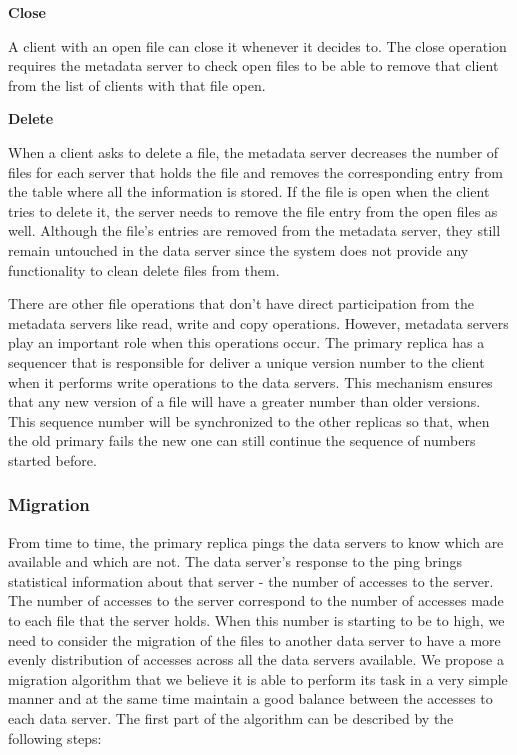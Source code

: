 
\bigskip
\textbf{Close}
\smallskip

A client with an open file can close it whenever it decides to. The close
operation requires the metadata server to check open files to be able to
remove that client from the list of clients with that file open.

\bigskip
\textbf{Delete}
\smallskip

When a client asks to delete a file, the metadata server decreases the
number of files for each server that holds the file and removes the 
corresponding entry from the table where all the information is stored.
If the file is open when the client tries to delete it, the server needs
to remove the file entry from the open files as well.
Although the file's entries are removed from the metadata server, they
still remain untouched in the data server since the system does not provide
any functionality to clean delete files from them.

\bigskip

There are other file operations that don't have direct participation from the
metadata servers like read, write and copy operations. However, metadata servers
play an important role when this operations occur. The primary replica has a sequencer
that is responsible for deliver a unique version number to the client when it performs
write operations to the data servers. This mechanism ensures that any new version of a
file will have a greater number than older versions. This sequence number will be
synchronized to the other replicas so that, when the old primary fails the new one can
still continue the sequence of numbers started before.

\subsubsection{Migration}

From time to time, the primary replica pings the data servers to know
which are available and which are not. The data server's response to the ping
brings statistical information about that server - the number of accesses to
the server. The number of accesses to the server correspond to the number
of accesses made to each file that the server holds. When this number is
starting to be to high, we need to consider the migration of the files to another
data server to have a more evenly distribution of accesses across all the data
servers available. We propose a migration algorithm that we believe it is able
to perform its task in a very simple manner and at the same time maintain
a good balance between the accesses to each data server. The first part of the
algorithm can be described by the following steps:

